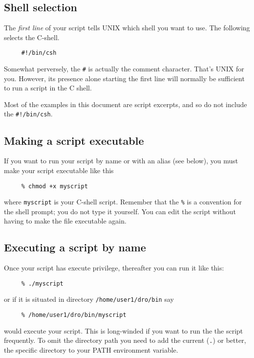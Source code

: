 \documentclass[twoside,11pt]{article}
\newcommand{\htmlref}[2]{#1}
\newcommand{\latex}[1]{#1}
\newcommand{\xlabel}[1]{}
\newcommand{\latexelsehtml}[2]{#1}
\newcommand{\latexelsehtml}[2]{#2}
\begin{document}
\subsection{\xlabel{sc4_se_cshselect}Shell selection\label{sc4_se_cshselect}}

The {\em first line\/} of your script tells UNIX which shell you want
to use.  The following selects the C-shell.

\small
\begin{verbatim}
     #!/bin/csh
\end{verbatim}
\normalsize
Somewhat perversely, the {\tt \#} is actually the comment character.
That's UNIX for you.  However, its presence alone starting the first
line will normally be sufficient to run a script in the C shell.

Most of the examples in this document are script excerpts, and so do not
include the \mbox{\tt \#!/bin/csh}.

\subsection{\xlabel{sc4_se_executable}Making a script executable
\label{sc4_se_executable}}

If you want to run your script by name or with an \htmlref{{\sf
alias}}{sc4_gl_alias}\latex{ (see below)}, you must make your
script executable like this

\small
\begin{verbatim}
     % chmod +x myscript
\end{verbatim}
\normalsize
where {\tt myscript} is your C-shell script. \latexelsehtml{Remember}{Note}
that the {\tt \%} is a convention for the shell prompt; you do not type
it yourself.  You can edit the script without having to make the file
executable again.

\subsection{\xlabel{sc4_se_byname}Executing a script by name
\label{sc4_se_by_name}}

Once your script has execute privilege, thereafter you can
run it like this:

\small
\begin{verbatim}
     % ./myscript
\end{verbatim}
\normalsize
or if it is situated in directory {\tt /home/user1/dro/bin} say

\small
\begin{verbatim}
     % /home/user1/dro/bin/myscript
\end{verbatim}
\normalsize
would execute your script.  This is long-winded if you want to run the
the script frequently.  To omit the directory \htmlref{{\sf
path}}{sc4_gl_path} you need to add the current ({\tt{.}}) or better,
the specific directory to your PATH
\htmlref{{\sf environment variable}}{sc4_gl_env}.
\end{document}
